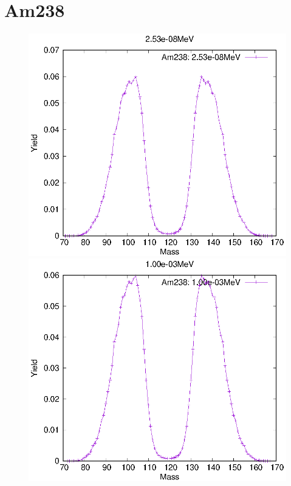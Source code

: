 \section{Am238}
\begin{figure}[htbp]
 \begin{minipage}{0.33\textwidth} \begin{center} \includegraphics[width=\textwidth]{YA/Am238_2.53e-08.eps} \end{center} \end{minipage}
\begin{minipage}{0.33\textwidth} \begin{center} \includegraphics[width=\textwidth]{YA/Am238_1.00e-03.eps} \end{center} \end{minipage}

\end{figure}
